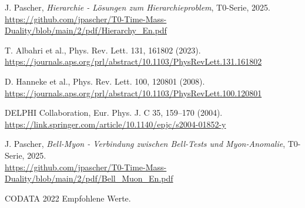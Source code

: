 \documentclass[12pt,a4paper]{article}
\begin{document}
\begin{thebibliography}{99}
		 J. Pascher, \textit{Hierarchie - Lösungen zum Hierarchieproblem}, T0-Serie, 2025. \\
		\url{https://github.com/jpascher/T0-Time-Mass-Duality/blob/main/2/pdf/Hierarchy_En.pdf}
		
		 T. Albahri et al., Phys. Rev. Lett. 131, 161802 (2023). \\
		\url{https://journals.aps.org/prl/abstract/10.1103/PhysRevLett.131.161802}
		
		 D. Hanneke et al., Phys. Rev. Lett. 100, 120801 (2008). \\
		\url{https://journals.aps.org/prl/abstract/10.1103/PhysRevLett.100.120801}
		
		 DELPHI Collaboration, Eur. Phys. J. C 35, 159--170 (2004). \\
		\url{https://link.springer.com/article/10.1140/epjc/s2004-01852-y}
		
		 J. Pascher, \textit{Bell-Myon - Verbindung zwischen Bell-Tests und Myon-Anomalie}, T0-Serie, 2025. \\
		\url{https://github.com/jpascher/T0-Time-Mass-Duality/blob/main/2/pdf/Bell_Muon_En.pdf}
		
		 CODATA 2022 Empfohlene Werte.
	\end{thebibliography}
	
\end{document}
